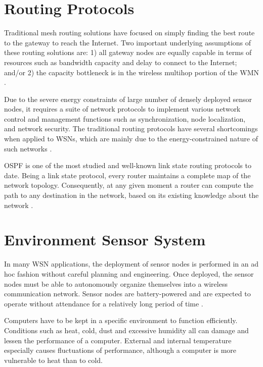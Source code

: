\section{Routing Protocols}


Traditional mesh routing solutions have focused on simply finding the best route to the gateway to reach the Internet. Two important underlying assumptions of these routing solutions are: 1) all gateway nodes are equally capable in terms of resources such as bandwidth capacity and delay to connect to the Internet; and/or 2) the capacity bottleneck is in the wireless multihop portion of the WMN \cite{Prashanth2015}.

Due to the severe energy constraints of large number of densely deployed sensor nodes, it requires a suite of network protocols to implement various network control and management functions such as synchronization, node localization, and network security. The traditional routing protocols have several shortcomings when applied to WSNs, which are mainly due to the energy-constrained nature of such networks \cite{Shio2010}.

OSPF is one of the most studied and well-known link state routing protocols to date. Being a link state protocol, every router maintains a complete map of the network topology. Consequently, at any given moment a router can compute the path to any destination in the network, based on its existing knowledge about the network \cite{Holter2010}.

\section{Environment Sensor System}
In many WSN applications, the deployment of sensor nodes is performed in an ad hoc fashion without careful planning and engineering. Once deployed, the sensor nodes must be able to autonomously organize themselves into a wireless communication network. Sensor nodes are battery-powered and are expected to operate without attendance for a relatively long period of time \cite{Shio2010}.

Computers have to be kept in a specific environment to function efficiently. Conditions such as heat, cold, dust and excessive humidity all can damage and lessen the performance of a computer. External and internal temperature especially causes fluctuations of performance, although a computer is more vulnerable to heat than to cold.

